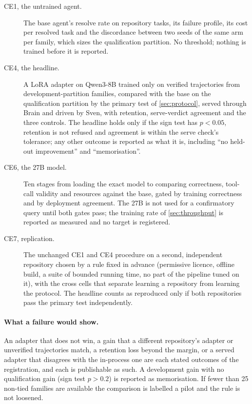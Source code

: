 \begin{description}
\item[CE1, the untrained agent.] The base agent's resolve rate on repository tasks, its failure
profile, its cost per resolved task and the discordance between two seeds of the same arm per
family, which sizes the qualification partition. No threshold; nothing is trained before it is
reported.
\item[CE4, the headline.] A LoRA adapter on Qwen3-8B trained only on verified trajectories from
development-partition families, compared with the base on the qualification partition by the
primary test of \cref{sec:protocol}, served through Brain and driven by Sven, with retention,
serve-verdict agreement and the three controls. The headline holds only if the sign test has
$p<0.05$, retention is not refused and agreement is within the serve check's tolerance; any
other outcome is reported as what it is, including ``no held-out improvement'' and
``memorisation''.
\item[CE6, the 27B model.] Ten stages from loading the exact model to comparing correctness,
tool-call validity and resources against the base, gated by training correctness and by
deployment agreement. The 27B is not used for a confirmatory query until both gates pass;
the training rate of \cref{sec:throughput} is reported as measured and no target is
registered.
\item[CE7, replication.] The unchanged CE1 and CE4 procedure on a second, independent
repository chosen by a rule fixed in advance (permissive licence, offline build, a suite of
bounded running time, no part of the pipeline tuned on it), with the cross cells that separate
learning a repository from learning the protocol. The headline counts as reproduced only if
both repositories pass the primary test independently.
\end{description}

\begin{table}[t]
\centering\small

\caption{Paired outcomes over qualification-partition families (wins: the adapter resolves more
of the family than the base; losses: fewer), with the exact one-sided sign test. Every cell is
empty until its run exists; a cell is never filled with an estimate.}\label{tab:results}
\end{table}

\paragraph{What a failure would show.} An adapter that does not win, a gain that a different
repository's adapter or unverified trajectories match, a retention loss beyond the margin, or
a served adapter that disagrees with the in-process one are each stated outcomes of the
registration, and each is publishable as such. A development gain with no qualification gain
(sign test $p>0.2$) is reported as memorisation. If fewer than 25 non-tied families are
available the comparison is labelled a pilot and the rule is not loosened.
